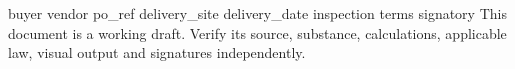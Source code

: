 \documentclass[11pt,a4paper]{article}
\begin{document}
{{buyer}}
{{vendor}}
{{po_ref}}
{{delivery_site}}
{{delivery_date}}
{{inspection}}
{{terms}}
{{signatory}}
This document is a working draft. Verify its source, substance, calculations, applicable law, visual output and signatures independently.
\end{document}
